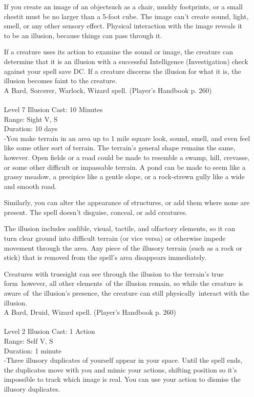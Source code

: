 \documentclass[10pt,twocolumn]{report}
\begin{document}
If you create an image of an objectsuch as a chair, muddy footprints, or a small chestit must be no larger than a 5-foot cube. The image can’t create sound, light, smell, or any other sensory effect. Physical interaction with the image reveals it to be an illusion, because things can pass through it.

If a creature uses its action to examine the sound or image, the creature can determine that it is an illusion with a successful Intelligence (Investigation) check against your spell save DC. If a creature discerns the illusion for what it is, the illusion becomes faint to the creature.\\
A Bard, Sorcerer, Warlock, Wizard spell. (Player's Handbook p. 260) \\


 \\
Level 7 \quad Illusion \quad Cast: 10 Minutes\\
Range: Sight \quad V, S\\
Duration: 10 days \quad \\
-You make terrain in an area up to 1 mile square look, sound, smell, and even feel like some other sort of terrain.
The terrain’s general shape remains the same, however. Open fields or a road could be made to resemble a swamp, hill, crevasse, or some other difficult or impassable terrain. A pond can be made to seem like a grassy meadow, a precipice like a gentle slope, or a rock-strewn gully like a wide and smooth road.

Similarly, you can alter the appearance of structures, or add them where none are present. The spell doesn’t disguise, conceal, or add creatures.

The illusion includes audible, visual, tactile, and olfactory elements, so it can turn clear ground into difficult terrain (or vice versa) or otherwise impede movement through the area. Any piece of the illusory terrain (such as a rock or stick) that is removed from the spell’s area disappears immediately.

Creatures with truesight can see through the illusion to the terrain’s true form however, all other elements of the illusion remain, so while the creature is aware of the illusion’s presence, the creature can still physically interact with the illusion.\\
A Bard, Druid, Wizard spell. (Player's Handbook p. 260) \\


 \\
Level 2 \quad Illusion \quad Cast: 1 Action\\
Range: Self \quad V, S\\
Duration: 1 minute \quad \\
-Three illusory duplicates of yourself appear in your space.
Until the spell ends, the duplicates move with you and mimic your actions, shifting position so it’s impossible to track which image is real. You can use your action to dismiss the illusory duplicates.
\end{document}
